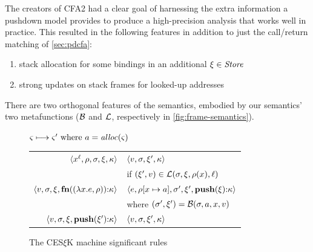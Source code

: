 The creators of CFA2 had a clear goal of harnessing the extra information a pushdown model provides to produce a high-precision analysis that works well in practice.
%
This resulted in the following features in addition to just the call/return matching of \autoref{sec:pdcfa}:
%

\begin{enumerate}
\item{stack allocation for some bindings in an additional $\mframe \in \Store$}
\item{strong updates on stack frames for looked-up addresses}
\end{enumerate}
There are two orthogonal features of the semantics, embodied by our semantics' two metafunctions ($\bind$ and $\lookup$, respectively in \autoref{fig:frame-semantics}).

\begin{figure}
  \centering
  $\mstate \stepto \mstate' \text{ where } \maddr = \alloc(\mstate)$ \\
  \begin{tabular}{r|l}
    \hline
    $\tpl{\svar[\mlab]{\mvar}, \menv, \mstore, \mframe, \mkont}$
    &
    $\tpl{\mval,\mstore,\mframe',\mkont}$
    \\ & if $(\mframe', \mval) \in \lookup(\mstore,\mframe,\menv(\mvar),\mlab)$
    \\
    $\tpl{\mval,\mstore,\mframe,\kcons{\kfn{\vclo{\slam{\mvar}{\mexpr}}{\menv}}}{\mkont}}$
    &
    $\tpl{\mexpr, \extm{\menv}{\mvar}{\maddr}, \mstore', \mframe', \kcons{\kpush{\mframe}}{\mkont}}$
    \\ & where $(\mstore',\mframe') = \bind(\mstore,\maddr,\mvar,\mval)$
    \\
    $\tpl{\mval,\mstore,\mframe,\kcons{\kpush{\mframe'}}{\mkont}}$
    &
    $\tpl{\mval,\mstore,\mframe',\mkont}$
  \end{tabular}
  \caption{The CES$\xi$K machine significant rules}
  \label{fig:frame-semantics}
\end{figure}

